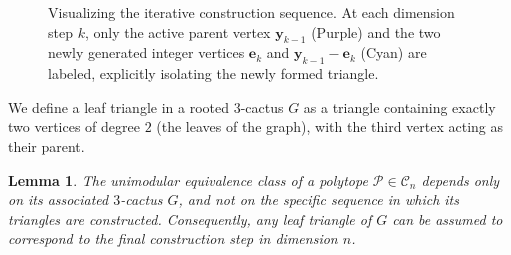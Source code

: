 \documentclass[a4paper,11pt,reqno]{amsart}
\newtheorem{lemma}[theorem]{Lemma}
\begin{document}
\begin{figure}[H]
		\caption{Visualizing the iterative construction sequence. At each dimension step $k$, only the active parent vertex $\bm{y}_{k-1}$ (Purple) 
		and the two newly generated integer vertices $\bm{e}_k$ and $\bm{y}_{k-1}-\bm{e}_k$ (Cyan) are labeled, explicitly isolating the newly 
		formed triangle.}
		\label{fig:full_construction}
	\end{figure}

We define a leaf triangle in a rooted $3$-cactus $G$ as a triangle containing exactly two vertices of degree $2$ (the leaves of the graph), 
with the third vertex acting as their parent.
\begin{lemma}\label{lemma:permutation}
The unimodular equivalence class of a polytope $\mathcal{P} \in \mathcal{C}_n$ depends only on its associated $3$-cactus $G$, 
and not on the specific sequence in which its triangles are constructed. Consequently, any leaf triangle of $G$ can be assumed to 
correspond to the final construction step in dimension $n$.
\end{lemma}
\end{document}
